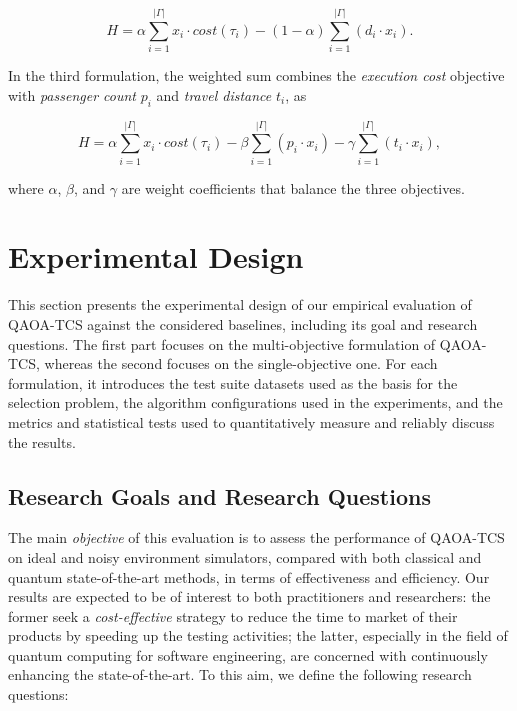 \begin{equation}
H = \alpha \sum_{i=1}^{|\Gamma|} x_i \cdot cost(\tau_i) 
  - (1-\alpha) \sum_{i=1}^{|\Gamma|} (d_i \cdot x_i).
\end{equation}

In the third formulation, the weighted sum combines the \emph{execution cost} objective with \emph{passenger count} $p_i$ and \emph{travel distance} $t_i$, as

\begin{equation}
H = \alpha \sum_{i=1}^{|\Gamma|} x_i \cdot cost(\tau_i) 
  - \beta \sum_{i=1}^{|\Gamma|} (p_i \cdot x_i)
  - \gamma \sum_{i=1}^{|\Gamma|} (t_i \cdot x_i),
\end{equation}

where $\alpha$, $\beta$, and $\gamma$ are weight coefficients that balance the three objectives.

\section{Experimental Design}
\label{sec:design}

This section presents the experimental design of our empirical evaluation of QAOA-TCS against the considered baselines, including its goal and research questions. The first part focuses on the multi-objective formulation of \textsc{QAOA-TCS}, whereas the second focuses on the single-objective one. For each formulation, it introduces the test suite datasets used as the basis for the selection problem, the algorithm configurations used in the experiments, and the metrics and statistical tests used to quantitatively measure and reliably discuss the results.

\subsection{Research Goals and Research Questions}
\label{sec:4.1}
The main \textit{objective} of this evaluation is to assess the performance of \textsc{QAOA-TCS} on ideal and noisy environment simulators, compared with both classical and quantum state-of-the-art methods, in terms of effectiveness and efficiency. Our results are expected to be of interest to both practitioners and researchers: the former seek a \textit{cost-effective} strategy to reduce the time to market of their products by speeding up the testing activities; the latter, especially in the field of quantum computing for software engineering, are concerned with continuously enhancing the state-of-the-art. To this aim, we define the following research questions:  

